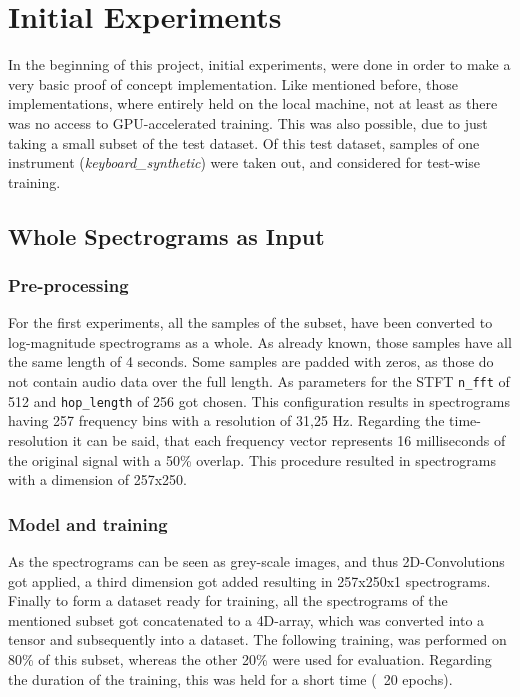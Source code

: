  
\section{Initial Experiments}
In the beginning of this project, initial experiments, were done in order to make a very basic proof of concept implementation. Like mentioned before, those implementations, where entirely held on the local machine, not at least as there was no access to GPU-accelerated training. This was also possible, due to just taking a small subset of the test dataset. Of this test dataset, samples of one instrument (\textit{keyboard\_synthetic}) were taken out, and considered for test-wise training.

\subsection{Whole Spectrograms as Input}

\subsubsection{Pre-processing}
For the first experiments, all the samples of the subset, have been converted to log-magnitude spectrograms as a whole. As already known, those samples have all the same length of 4 seconds. Some samples are padded with zeros, as those do not contain audio data over the full length. As parameters for the STFT \texttt{n\_fft} of 512 and \texttt{hop\_length} of 256 got chosen. This configuration results in spectrograms having 257 frequency bins with a resolution of 31,25 Hz. Regarding the time-resolution it can be said, that each frequency vector represents 16 milliseconds of the original signal with a 50\% overlap. This procedure resulted in spectrograms with a dimension of 257x250. 

\subsubsection{Model and training}
As the spectrograms can be seen as grey-scale images, and thus 2D-Convolutions got applied, a third dimension got added resulting in 257x250x1 spectrograms.  Finally to form a dataset ready for training, all the spectrograms of the mentioned subset got concatenated to a 4D-array, which was converted into a tensor and subsequently into a dataset. The following training, was performed on 80\% of this subset, whereas the other 20\% were used for evaluation. Regarding the duration of the training, this was held for a short time (~20 epochs).

